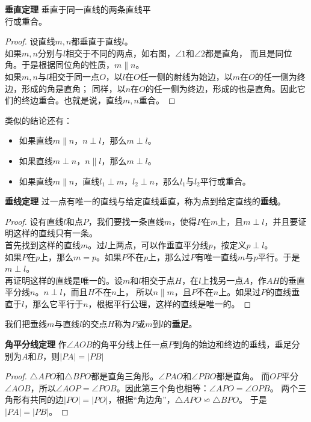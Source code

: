 \documentclass[12pt,UTF8,fontset=none]{ctexbook}
\begin{document}
\begin{tm}{\textbf{垂直定理}}\label{tm:3-1-0}
    垂直于同一直线的两条直线平\\
    行或重合。
\end{tm}
\begin{proof}
    设直线$m,n$都垂直于直线$l$。\\
    如果$m,n$分别与$l$相交于不同的两点，如右图，$\angle 1$和$\angle 2$都是直角，
    而且是同位角。于是根据同位角的性质，$m \parallel n$。\\
    如果$m,n$与$l$相交于同一点$O$，以$l$在$O$任一侧的射线为始边，以$m$在$O$的任一侧为终边，形成的角是直角；
    同样，以$n$在$O$的任一侧为终边，形成的也是直角。因此它们的终边重合。也就是说，直线$m,n$重合。
\end{proof}

类似的结论还有：
\begin{itemize}
    \item 如果直线$m \parallel n$，$n \perp l$，那么$m \perp l$。
    \item 如果直线$m \perp n$，$n \parallel l$，那么$m \perp l$。
    \item 如果直线$m \parallel n$，直线$l_1 \perp m$，$l_2 \perp n$，那么$l_1$与$l_2$平行或重合。
\end{itemize}
\begin{tm}{\textbf{垂线定理}}\label{tm:3-1-1}
    过一点有唯一的直线与给定直线垂直，称为点到给定直线的\textbf{垂线}。
\end{tm}
\begin{proof}
    设有直线$l$和点$P$，我们要找一条直线$m$，使得$P$在$m$上，且$m\perp l$，并且要证明这样的直线只有一条。\\
    首先找到这样的直线$m$。过$l$上两点，可以作垂直平分线$p$，按定义$p \perp l$。\\
    如果$P$在$p$上，那么$m=p$。如果$P$不在$p$上，那么过$P$有唯一直线$m$与$p$平行。于是$m\perp l$。\\
    再证明这样的直线是唯一的。设$m$和$l$相交于点$H$，在$l$上找另一点$A$，作$AH$的垂直平分线$n$。$n\perp l$，而且$H$不在$n$上，
    所以$n \parallel m$，且$P$不在$n$上。如果过$P$的直线垂直于$l$，那么它平行于$n$，根据平行公理，这样的直线是唯一的。
\end{proof}

我们把垂线$m$与直线$l$的交点$H$称为$P$或$m$到$l$的\textbf{垂足}。

\begin{tm}{\textbf{角平分线定理}}\label{tm:3-1-20}
    作$\angle AOB$的角平分线上任一点$P$到角的始边和终边的垂线，垂足分别为$A$和$B$，则$|PA| = |PB|$
\end{tm}
\begin{proof}
    $\triangle APO$和$\triangle BPO$都是直角三角形。$\angle PAO$和$\angle PBO$都是直角。
    而$OP$平分$\angle AOB$，所以$\angle AOP = \angle POB$。因此第三个角也相等：$\angle APO = \angle OPB$。
    两个三角形有共同的边$|PO| = |PO|$，根据“角边角”，$\triangle APO \backsimeq \triangle BPO$。
    于是$|PA| = |PB|$。
\end{proof}
\end{document}
